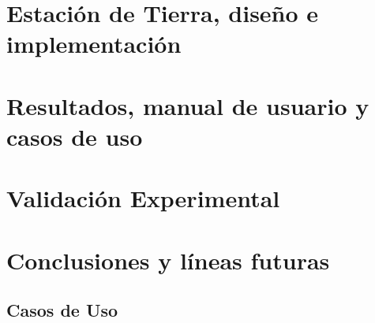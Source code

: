 \documentclass[a4paper, 12pt]{memoir} %
\begin{document}
\chapter{Estación de Tierra, diseño e implementación} \label{chapter:dis-impl}


\chapter{Resultados, manual de usuario y casos de uso} \label{chapter:results}


\chapter{Validación Experimental} \label{chapter:experim}


\chapter{Conclusiones y líneas futuras} \label{chapter:concl}


\begin{appendices}
% 

\chapter{Casos de Uso} \label{chapter:use-case}


\end{appendices}

\glsaddall %

\end{document}
